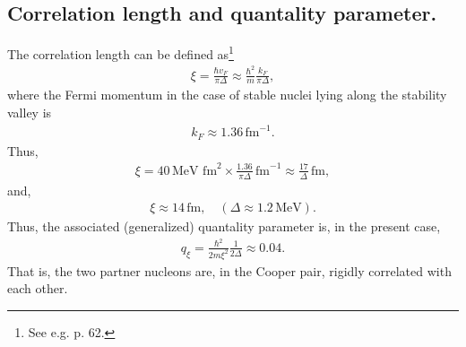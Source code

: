 \begin{subappendices}
\section{Correlation length and quantality parameter.}\label{App6H}
The correlation length can be defined as\footnote{See e.g. \cite{Annett:13} p. 62.}
\begin{align}\label{eqApp6H1}
\xi=\frac{\hbar v_F}{\pi\Delta}\approx\frac{\hbar^2}{m}\frac{k_F}{\pi\Delta},
\end{align}
where the Fermi momentum in the case of stable nuclei lying along the stability valley is
\begin{align}\label{eqApp6H2}
k_F\approx 1.36\,\text{fm}^{-1}.
\end{align}
Thus,
\begin{align}\label{eqApp6H3} 	
\xi=40\,\text{MeV fm}^2\times \frac{1.36}{\pi\Delta}\,\text{fm}^{-1}\approx \frac{17}{\Delta}\,\text{fm},
\end{align}
and,
\begin{align}\label{eqApp6H4}
\xi\approx 14\,\text{fm},\quad (\Delta\approx1.2\,\text{MeV}).
\end{align}
Thus, the associated (generalized) quantality parameter is, in the present case,
\begin{align}\label{eqApp6H8}
q_\xi=\frac{\hbar^2}{2m\xi^2}\frac{1}{2\Delta}\approx0.04.
\end{align} 
That is, the two partner nucleons are, in the Cooper pair, rigidly correlated with each other.




\end{subappendices}

